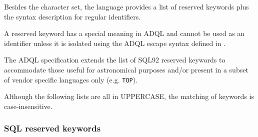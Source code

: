\documentclass[11pt,a4paper]{ivoa}
\begin{document}
Besides the character set, the language provides a list of reserved keywords
plus the syntax description for regular identifiers.

A reserved keyword has a special meaning in ADQL and cannot be used as
an identifier unless it is isolated using the ADQL escape syntax defined
in .

The ADQL specification extends the list of SQL92 reserved keywords to accommodate
those useful for astronomical purposes and/or present in a subset of vendor
specific languages only (e.g. \verb:TOP:).

Although the following lists are all in UPPERCASE, the matching of keywords
is case-insensitive.

\subsubsection{SQL reserved keywords}
\label{sec:adql.keywords}
\end{document}
